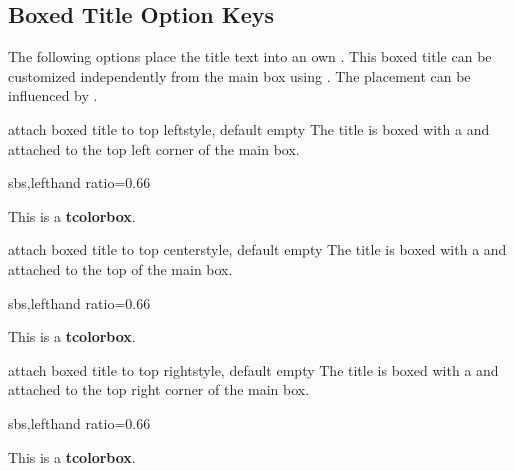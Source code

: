 \clearpage
\subsection{Boxed Title Option Keys}\label{subsec:skinboxedtitle}

The following options place the title text into an own .
This boxed title can be customized independently from the main box using
.
The placement can be influenced by .

\begin{docTcbKey}{attach boxed title to top left}{}{style, default empty}
The title is boxed with a  and attached to
the top left corner of the main box.
\begin{dispExample*}{sbs,lefthand ratio=0.66}
\begin{tcolorbox}[enhanced,title=My title,
  attach boxed title to top left]
  This is a \textbf{tcolorbox}.
\end{tcolorbox}
\end{dispExample*}
\end{docTcbKey}

\begin{docTcbKey}{attach boxed title to top center}{}{style, default empty}
The title is boxed with a  and attached to
the top of the main box.
\begin{dispExample*}{sbs,lefthand ratio=0.66}
\begin{tcolorbox}[enhanced,title=My title,
  attach boxed title to top center]
  This is a \textbf{tcolorbox}.
\end{tcolorbox}
\end{dispExample*}
\end{docTcbKey}

\begin{docTcbKey}{attach boxed title to top right}{}{style, default empty}
The title is boxed with a  and attached to
the top right corner of the main box.
\begin{dispExample*}{sbs,lefthand ratio=0.66}
\begin{tcolorbox}[enhanced,title=My title,
  attach boxed title to top right]
  This is a \textbf{tcolorbox}.
\end{tcolorbox}
\end{dispExample*}
\end{docTcbKey}

